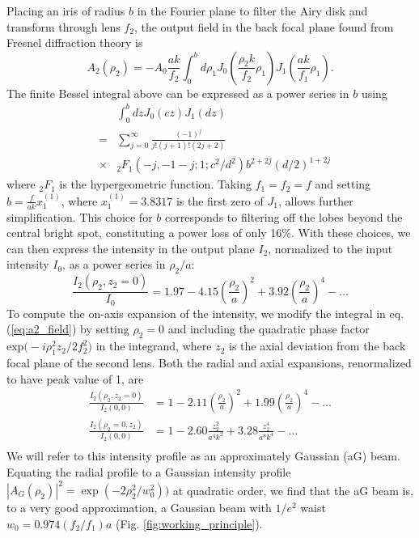 Placing an iris of radius $b$ in the Fourier plane to filter the Airy disk and transform through lens $f_2$, the output field in the back focal plane found from Fresnel diffraction theory is 
\begin{equation}
A_{2}\left(\rho_{2}\right)=-A_{0} \frac{a k}{f_{2}} \int_{0}^{b} d \rho_{1} J_{0}\left(\frac{\rho_{2} k}{f_{2}} \rho_{1}\right) J_{1}\left(\frac{a k}{f_{1}} \rho_{1}\right).
\label{eq:a2_field}
\end{equation}
 The finite Bessel integral above can be expressed as a power series in $b$ using 
\begin{eqnarray}
     &&\int_{0}^{b} d z J_{0}(c z) J_{1}(d z) \nonumber\\
     &=& 
  \sum_{j=0}^{\infty} \frac{(-1)^{j}}{j !(j+1) !(2 j+2)} \nonumber\\
  &\times&  { }_{2} F_{1}\left(-j,-1-j ; 1 ; c^{2} / d^{2}\right) b^{2+2 j}(d / 2)^{1+2 j}\nonumber
\end{eqnarray}
where $_2F_1$ is the hypergeometric function\cite{pochernyaev1995}. Taking $f_1 = f_2 = f$ and setting $b=\frac{f}{a k} x_1^{(1)}$, where $x_1^{(1)}=3.8317$ is the first zero of $J_1$, allows further simplification. This choice for $b$ corresponds to filtering off the lobes beyond the central bright spot, constituting a power loss of only 16$\%$. With these choices, we can then express the intensity in the output plane $I_2$, normalized to the input intensity $I_0$, as a power series in $\rho_2/a$:
\begin{equation}\label{eq:Iag_radial}
    \frac{I_{2}\left(\rho_{2},z_2=0\right)}{I_{0}}=1.97-4.15\left(\frac{\rho_{2}}{a}\right)^{2}+3.92\left(\frac{\rho_{2}}{a}\right)^{4}-\ldots
\end{equation}
To compute the on-axis expansion of the intensity, we modify the integral in eq. (\ref{eq:a2_field}) by setting $\rho_2=0$ and including the quadratic phase factor $\text{exp}\big(-i\rho_1^2 z_2/2 f_2^2\big)$ in the integrand, where $z_2$ is the axial deviation from the back focal plane of the second lens. Both the radial and axial expansions, renormalized to have peak value of 1, are
\begin{equation}\label{eq:Iag_bright}
\begin{aligned}
\frac{I_{2}\left(\rho_{2},z_2=0\right)}{I_2(0,0)}&=1-2.11\left(\frac{\rho_{2}}{a}\right)^{2}+1.99\left(\frac{\rho_{2}}{a}\right)^{4}-\ldots\\
\frac{I_2(\rho_2=0,z_2)}{I_2(0,0)}&= 1 - 2.60 \frac{z_2^2}{a^4 k^2} + 3.28\frac{z_2^4}{a^8 k^4} - ...\\
\end{aligned}
\end{equation}
We will refer to this intensity profile as an approximately Gaussian (aG) beam. Equating the radial profile to a Gaussian intensity profile $|A_G(\rho_2)|^2 = \exp(-2 \rho_2^2/w_0^2))$ at quadratic order, we find that the aG beam is, to a very good approximation, a Gaussian beam with $1/e^2$ waist $w_0=0.974 (f_2/f_1)a$  (Fig. \ref{fig:working_principle}). 
 
